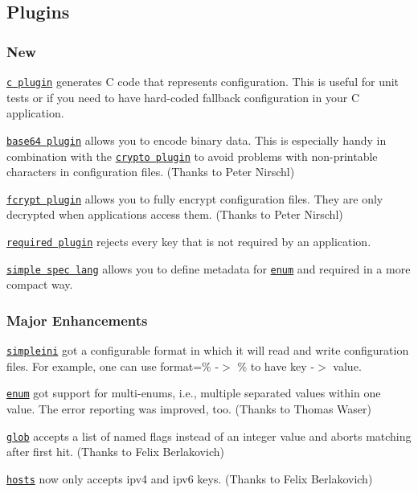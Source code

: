 \subsection*{Plugins}

\subsubsection*{New}


\begin{DoxyItemize}
\item \href{https://master.libelektra.org/src/plugins/c}{\tt c plugin} generates C code that represents configuration. This is useful for unit tests or if you need to have hard-\/coded fallback configuration in your C application.
\item \href{https://master.libelektra.org/src/plugins/base64}{\tt base64 plugin} allows you to encode binary data. This is especially handy in combination with the \href{https://master.libelektra.org/src/plugins/crypto}{\tt crypto plugin} to avoid problems with non-\/printable characters in configuration files. (Thanks to Peter Nirschl)
\item \href{https://master.libelektra.org/src/plugins/fcrypt}{\tt fcrypt plugin} allows you to fully encrypt configuration files. They are only decrypted when applications access them. (Thanks to Peter Nirschl)
\item \href{https://master.libelektra.org/src/plugins/required}{\tt required plugin} rejects every key that is not required by an application.
\item \href{https://master.libelektra.org/src/plugins/simplespeclang}{\tt simple spec lang} allows you to define metadata for \href{https://master.libelektra.org/src/plugins/enum}{\tt enum} and required in a more compact way.
\end{DoxyItemize}

\subsubsection*{Major Enhancements}


\begin{DoxyItemize}
\item \href{https://master.libelektra.org/src/plugins/simpleini}{\tt simpleini} got a configurable format in which it will read and write configuration files. For example, one can use {\ttfamily format=\% -\/$>$ \%} to have {\ttfamily key -\/$>$ value}.
\item \href{https://master.libelektra.org/src/plugins/enum}{\tt enum} got support for multi-\/enums, i.\+e., multiple separated values within one value. The error reporting was improved, too. (Thanks to Thomas Waser)
\item \href{https://master.libelektra.org/src/plugins/glob}{\tt glob} accepts a list of named flags instead of an integer value and aborts matching after first hit. (Thanks to Felix Berlakovich)
\item \href{https://master.libelektra.org/src/plugins/hosts}{\tt hosts} now only accepts {\ttfamily ipv4} and {\ttfamily ipv6} keys. (Thanks to Felix Berlakovich)
\end{DoxyItemize}

